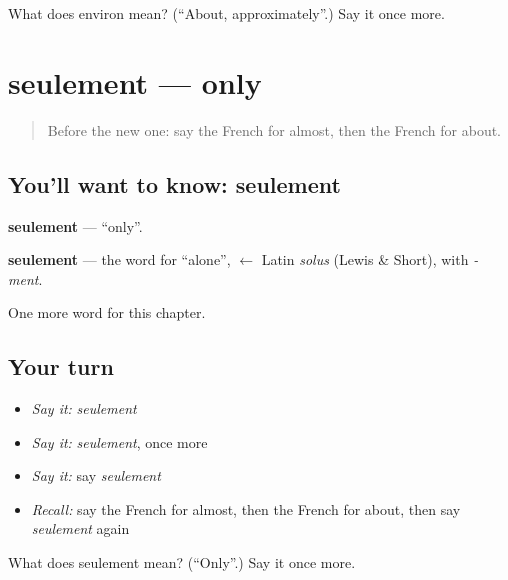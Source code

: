 \begin{tcolorbox}[breakable,colback=teal!4,colframe=teal!35!black,title={Before you move on}]
What does environ mean? (\textquotedblleft{}About, approximately\textquotedblright{}.) Say it once more.
\end{tcolorbox}
\section[seulement]{seulement — only}

\label{lesson:FR-C217-seulement}



\begin{quote}
Before the new one: say the French for almost, then the French for about.
\end{quote}

\subsection*{You'll want to know: seulement}
\textbf{seulement} — \textquotedblleft{}only\textquotedblright{}.

\begin{cousinweb}
\textbf{seulement} — the word for \textquotedblleft{}alone\textquotedblright{}, $\leftarrow$ Latin \emph{solus} (Lewis \& Short), with \emph{-ment}.
\end{cousinweb}

\begin{grammarlens}[title={What you've built}]
One more word for this chapter.
\end{grammarlens}

\subsection*{Your turn}
\begin{itemize}
\raggedright
  \item \emph{Say it:} \emph{seulement}
  \item \emph{Say it:} \emph{seulement}, once more
  \item \emph{Say it:} say \emph{seulement}
  \item \emph{Recall:} say the French for almost, then the French for about, then say \emph{seulement} again
\end{itemize}

\begin{tcolorbox}[breakable,colback=teal!4,colframe=teal!35!black,title={Before you move on}]
What does seulement mean? (\textquotedblleft{}Only\textquotedblright{}.) Say it once more.
\end{tcolorbox}
